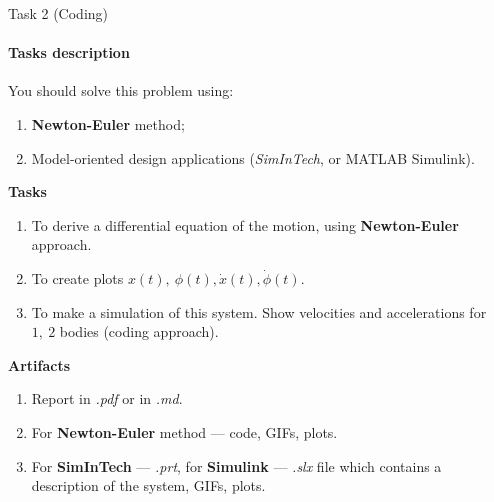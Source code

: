 \documentclass[aspectratio=169]{beamer}
\newcommand{\fbckg}[1]{\usebackgroundtemplate{\texttt{[image: \#1]}}}%
\begin{document}
  \begin{frame}[t]{Task 2 (Coding)}
    \framesubtitle{Tasks description}
          \footnotesize
          \vspace{-0.4cm}
          You should solve this problem using:
          \begin{enumerate}
            \item \textbf{Newton-Euler} method;
            \item Model-oriented design applications (\textit{SimInTech}, or MATLAB Simulink).
          \end{enumerate}
          \textbf{Tasks}
          \begin{enumerate}
            \item To derive a differential equation of the motion, using \textbf{Newton-Euler} approach.
            \item To create plots $x(t),\ \phi(t), \dot{x}(t), \dot{\phi}(t)$. 
            \item To make a simulation of this system. Show velocities and accelerations for $1,\ 2$ bodies (coding approach).
          \end{enumerate}
          \textbf{Artifacts}
          \begin{enumerate}
            \item Report in \textit{.pdf} or in \textit{.md}.
            \item For \textbf{Newton-Euler} method --- code, GIFs, plots.
            \item For \textbf{SimInTech} --- \textit{.prt}, for \textbf{Simulink} --- \textit{.slx} file which contains a description of the system, GIFs, plots.
          \end{enumerate}
    \end{frame}

\fbckg{fibeamer/figs/last_page.png}
\frame[plain]{}
\end{document}
